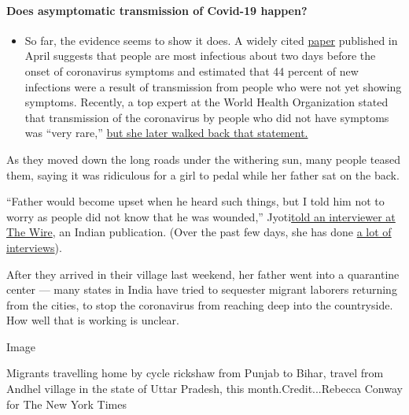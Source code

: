 \begin{itemize}
{  \paragraph{Does asymptomatic transmission of Covid-19
  happen?}\label{does-asymptomatic-transmission-of-covid-19-happen}}

  \begin{itemize}
  \tightlist
  \item
    So far, the evidence seems to show it does. A widely cited
    \href{https://www.nature.com/articles/s41591-020-0869-5}{paper}
    published in April suggests that people are most infectious about
    two days before the onset of coronavirus symptoms and estimated that
    44 percent of new infections were a result of transmission from
    people who were not yet showing symptoms. Recently, a top expert at
    the World Health Organization stated that transmission of the
    coronavirus by people who did not have symptoms was ``very rare,''
    \href{https://www.nytimes.com/2020/06/09/world/coronavirus-updates.html?action=click\&pgtype=Article\&state=default\&region=MAIN_CONTENT_3\&context=storylines_faq\#link-1f302e21}{but
    she later walked back that statement.}
  \end{itemize}
\end{itemize}

As they moved down the long roads under the withering sun, many people
teased them, saying it was ridiculous for a girl to pedal while her
father sat on the back.

``Father would become upset when he heard such things, but I told him
not to worry as people did not know that he was wounded,''
Jyoti\href{https://thewire.in/rights/jyoti-kumari-bihar-gurgaon-cycle-covid-19-lockdown}{told
an interviewer at The Wire}, an Indian publication. (Over the past few
days, she has done
\href{https://www.tribuneindia.com/news/nation/15-year-old-girl-brings-father-from-gurugram-to-bihar-on-bicycle-87464}{a
lot of interviews}).

After they arrived in their village last weekend, her father went into a
quarantine center --- many states in India have tried to sequester
migrant laborers returning from the cities, to stop the coronavirus from
reaching deep into the countryside. How well that is working is unclear.

Image

Migrants travelling home by cycle rickshaw from Punjab to Bihar, travel
from Andhel village in the state of Uttar Pradesh, this
month.Credit...Rebecca Conway for The New York Times


